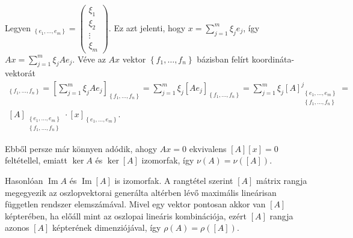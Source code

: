 \documentclass[9pt, a4paper, showtrims]{memoir}
\makeatletter
\renewenvironment{proof}[1][\proofname]
    {\par\pushQED{\qed}%
    \normalfont \topsep6\p@\@plus6\p@\relax
    \trivlist
    \item[\hskip\labelsep
        \itshape
    #1\@addpunct{:}]\ignorespaces}
    {\popQED\endtrivlist\@endpefalse}
\theoremstyle{plain}
\theoremstyle{remark}
\theoremstyle{definition}
\DeclareMathOperator{\im}{Im}
\makeatother
\begin{document}
\begin{proof}
	Legyen
	\begin{math}
		[x]_{\left\{ e_1,\ldots,e_m \right\}}
		=
		\begin{pmatrix}
			\xi_1 \\ \xi_2 \\ \vdots \\ \xi_m
		\end{pmatrix}.
	\end{math}
	Ez azt jelenti,
	hogy $x=\sum_{j=1}^m\xi_je_j$, így
	$Ax=\sum_{j=1}^m\xi_jAe_j$.
	Véve az $Ax$ vektor $\left\{ f_1,\ldots,f_n \right\}$ bázisban felírt koordináta-vektorát
	\begin{multline*}
		[Ax]_{\left\{ f_1,\ldots,f_n \right\}}
		=
		\left[ \sum_{j=1}^m\xi_jAe_j \right]_{\left\{ f_1,\ldots,f_n \right\}}
		=
		\sum_{j=1}^m\xi_j[Ae_j]_{\left\{ f_1,\ldots,f_n \right\}}
		=
		\sum_{j=1}^m\xi_j[A]_{\substack{\left\{ e_1,\ldots,e_m \right\}\\ \left\{ f_1,\ldots,f_n \right\}}}^j
		=\\
		[A]_{\substack{\left\{ e_1,\ldots,e_m \right\}\\ \left\{ f_1,\ldots,f_n \right\}}}
		\cdot
		[x]_{\left\{ e_1,\ldots,e_m \right\}}.
	\end{multline*}

	Ebből persze már könnyen adódik, ahogy $Ax=0$ ekvivalens $[A][x]=0$ feltétellel, emiatt
	$\ker A$ és $\ker [A]$ izomorfak,
	így $\nu(A)=\nu([A])$.

	Hasonlóan $\im A$ és $\im [A]$ is izomorfak.
	A rangtétel szerint $[A]$ mátrix rangja megegyezik az oszlopvektorai generálta altérben lévő maximális lineárisan
	független rendszer elemszámával.
	Mivel egy vektor pontosan akkor van $[A]$ képterében, ha előáll mint az oszlopai lineáris kombinációja,
	ezért $[A]$ rangja azonos $[A]$ képterének dimenziójával,
	így $\rho(A)=\rho([A])$.
\end{proof}
\end{document}
